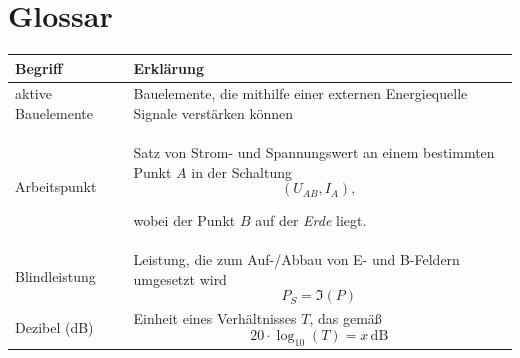 \documentclass{article}
\begin{document}


\newpage


\section{Glossar}
\begin{xltabular}{\linewidth}{p{6cm}|X}
	\hline\hline
		Begriff & Erklärung \\
	\hline
		aktive Bauelemente & Bauelemente, die mithilfe einer externen Energiequelle Signale verstärken können \\
	\hline
		Arbeitspunkt & Satz von Strom- und Spannungswert an einem bestimmten Punkt $A$ in der Schaltung
			$$(U_{AB},I_A),$$
		
		wobei der Punkt $B$ auf der \textit{Erde} liegt. \\
	\hline
		Blindleistung & Leistung, die zum Auf-/Abbau von E- und B-Feldern umgesetzt wird
			$$P_S = \Im(P)$$ \\
	\hline
		Dezibel (dB) & Einheit eines Verhältnisses $T$, das gemäß
			\begin{equation*}
				20 \cdot \log_{10}(T) = x \, \text{dB}
			\end{equation*}
		

\end{xltabular}
\end{document}
